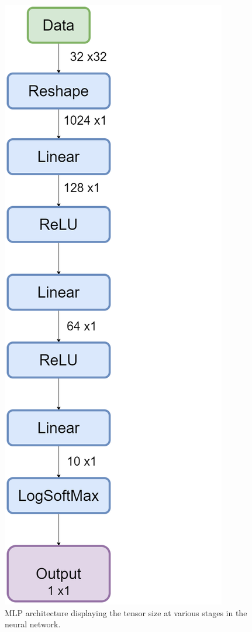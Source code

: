 \documentclass[conference]{IEEEtran}
\begin{document}
\begin{figure}[!h]

\centering
\includegraphics[scale = 0.2, keepaspectratio]{NNArchitecture}
\caption{MLP architecture displaying the tensor size at various stages in the neural network. }
\label{fig:MLPArch}

\end{figure}
\end{document}

